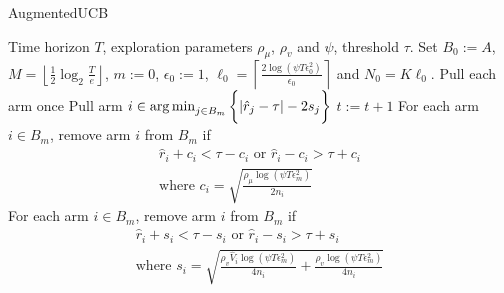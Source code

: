 \begin{algorithm}[th!]
\caption{AugmentedUCB}
\label{alg:augucb}
\begin{algorithmic}
 Time horizon $T$, exploration parameters $\rho_{\mu}$, $\rho_v$ and $\psi$, threshold $\tau$.
 Set $B_{0}:=A$, $M=\left\lfloor \frac{1}{2}\log_{2} \frac{T}{e}\right\rfloor $, $m:=0$, $\epsilon_{0}:=1$, $\ell_{0}=\left\lceil \frac{2\log(\psi T\epsilon_{0}^{2})}{\epsilon_{0}} \right\rceil$ and $N_{0}=K\ell_{0} $.
\State Pull each arm once
\State {}
\State Pull arm $i\in\operatorname*{arg\,min}_{j\in B_{m}}\bigg\lbrace |\hat{r}_{j} - \tau | - 2s_{j}\bigg\rbrace$
\State $t:=t+1$ 
\ArmElim
\State For each arm $i \in B_{m}$, remove arm ${i}$ from $B_{m}$ if
\begin{align*}
\hat{r}_{i} + c_i  < \tau - c_i \mbox{ or } \hat{r}_{i} - c_i  > \tau + c_i \\
\text{where $c_i=\sqrt{\frac{\rho_{\mu}\log{(\psi T\epsilon_{m}^{2})}}{2 n_{i}}}$}
\end{align*}
\EndArmElim
\ArmElimV
\State For each arm $i \in B_{m}$, remove arm ${i}$ from $B_{m}$ if
\begin{align*}
\hat{r}_{i} + s_i  < \tau - s_i \mbox{ or } \hat{r}_{i} - s_i  > \tau + s_i \\
\text{where $s_i=\sqrt{\frac{\rho_v\hat{V}_{i}\log{(\psi T\epsilon_{m}^{2})}}{4 n_{i}} + \frac{\rho_v \log{(\psi T\epsilon_{m}^{2})}}{4 n_{i}}}$}

\end{align*}
\end{algorithmic}
\end{algorithm}
